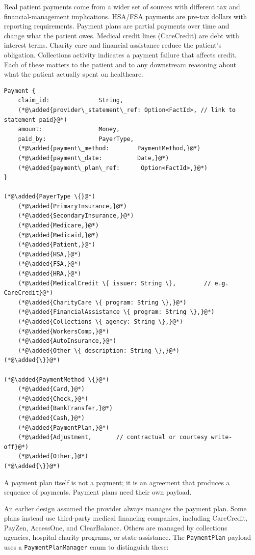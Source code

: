 \documentclass[11pt]{article}
\newcommand{\added}[1]{\textcolor{accentblue}{#1}}
\begin{document}
Real patient payments come from a wider set of sources with different
tax and financial-management implications. HSA/FSA payments are pre-tax
dollars with reporting requirements. Payment plans are partial payments
over time and change what the patient owes. Medical credit lines
(CareCredit) are debt with interest terms. Charity care and financial
assistance reduce the patient's obligation. Collections activity
indicates a payment failure that affects credit. Each of these matters
to the patient and to any downstream reasoning about what the patient
actually spent on healthcare.

\begin{lstlisting}
Payment {
    claim_id:              String,
    (*@\added{provider\_statement\_ref: Option<FactId>, // link to statement paid}@*)
    amount:                Money,
    paid_by:               PayerType,
    (*@\added{payment\_method:        PaymentMethod,}@*)
    (*@\added{payment\_date:          Date,}@*)
    (*@\added{payment\_plan\_ref:      Option<FactId>,}@*)
}

(*@\added{PayerType \{}@*)
    (*@\added{PrimaryInsurance,}@*)
    (*@\added{SecondaryInsurance,}@*)
    (*@\added{Medicare,}@*)
    (*@\added{Medicaid,}@*)
    (*@\added{Patient,}@*)
    (*@\added{HSA,}@*)
    (*@\added{FSA,}@*)
    (*@\added{HRA,}@*)
    (*@\added{MedicalCredit \{ issuer: String \},        // e.g. CareCredit}@*)
    (*@\added{CharityCare \{ program: String \},}@*)
    (*@\added{FinancialAssistance \{ program: String \},}@*)
    (*@\added{Collections \{ agency: String \},}@*)
    (*@\added{WorkersComp,}@*)
    (*@\added{AutoInsurance,}@*)
    (*@\added{Other \{ description: String \},}@*)
(*@\added{\}}@*)

(*@\added{PaymentMethod \{}@*)
    (*@\added{Card,}@*)
    (*@\added{Check,}@*)
    (*@\added{BankTransfer,}@*)
    (*@\added{Cash,}@*)
    (*@\added{PaymentPlan,}@*)
    (*@\added{Adjustment,       // contractual or courtesy write-off}@*)
    (*@\added{Other,}@*)
(*@\added{\}}@*)
\end{lstlisting}

A payment plan itself is not a payment; it is an agreement that
produces a sequence of payments. Payment plans need their own payload.

An earlier design assumed the provider always manages the payment plan. Some
plans instead use third-party medical financing companies, including
CareCredit, PayZen, AccessOne, and ClearBalance. Others are managed by
collections agencies, hospital charity programs, or state assistance. The
\texttt{PaymentPlan} payload uses a \texttt{PaymentPlanManager} enum
to distinguish these:
\end{document}

